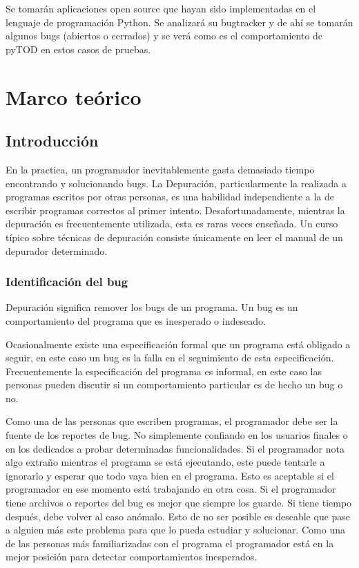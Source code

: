\documentclass[12pt,legalpaper]{report}
\begin{document}
 Se tomarán aplicaciones open source que hayan sido implementadas en el lenguaje de programación Python.  Se analizará su bugtracker y de ahí se tomarán algunos bugs (abiertos o cerrados) y se verá como es el comportamiento de pyTOD en estos casos de pruebas.


\chapter{Marco teórico}
	\section{Introducción}

En la practica, un programador inevitablemente gasta demasiado tiempo encontrando y solucionando bugs. La Depuración, particularmente la realizada a programas escritos por otras personas, es una habilidad independiente a la de escribir programas correctos al primer intento. Desafortunadamente, mientras la depuración es frecuentemente utilizada, esta es raras veces enseñada. Un curso típico sobre técnicas de depuración consiste únicamente en leer el manual de un depurador determinado.

\subsection{Identificación del bug}

Depuración significa remover los bugs de un programa.  Un bug es un comportamiento del programa que es inesperado o indeseado.

Ocasionalmente existe una especificación formal que un programa está obligado a seguir, en este caso un bug es la falla en el seguimiento de esta especificación.  Frecuentemente la especificación del programa es informal, en este caso las personas pueden discutir si un comportamiento particular es de hecho un bug o no.

Como una de las personas que escriben programas, el programador debe ser la fuente de los reportes de bug.  No simplemente confiando en los usuarios finales o en los dedicados a probar determinadas funcionalidades.  Si el programador nota algo extraño mientras el programa se está ejecutando, este puede tentarle a ignorarlo y esperar que todo vaya bien en el programa.  Esto es aceptable si el programador en ese momento está trabajando en otra cosa.  Si el programador tiene archivos o reportes del bug es mejor que siempre los guarde.  Si tiene tiempo después, debe volver al caso anómalo.  Esto de no ser posible es deseable que pase a alguien más este problema para que lo pueda estudiar y solucionar.  Como una de las personas más familiarizadas con el programa el programador está en la mejor posición para detectar comportamientos inesperados.
\end{document}
